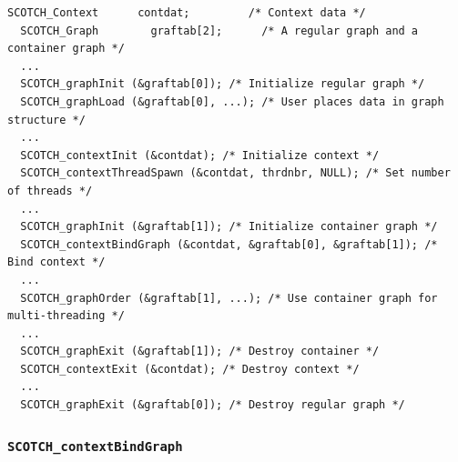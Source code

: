 \begin{lstlisting}[float,style=language-c,label={list-lib-context-spawn},caption={Sample
code for running multi-threaded computations using a dedicated
pool of threads. This code is run by the main thread. All
\libscotch\ routines which are passed the context graph (instead
of the regular graph) will make use of the dedicated pool. If
\libscotch\ routines are called on the regular graph, a local pool
is created and destroyed for every function call.}]
  SCOTCH_Context      contdat;         /* Context data */
  SCOTCH_Graph        graftab[2];      /* A regular graph and a container graph */
  ...
  SCOTCH_graphInit (&graftab[0]); /* Initialize regular graph */
  SCOTCH_graphLoad (&graftab[0], ...); /* User places data in graph structure */
  ...
  SCOTCH_contextInit (&contdat); /* Initialize context */
  SCOTCH_contextThreadSpawn (&contdat, thrdnbr, NULL); /* Set number of threads */
  ...
  SCOTCH_graphInit (&graftab[1]); /* Initialize container graph */
  SCOTCH_contextBindGraph (&contdat, &graftab[0], &graftab[1]); /* Bind context */
  ...
  SCOTCH_graphOrder (&graftab[1], ...); /* Use container graph for multi-threading */
  ...
  SCOTCH_graphExit (&graftab[1]); /* Destroy container */
  SCOTCH_contextExit (&contdat); /* Destroy context */
  ...
  SCOTCH_graphExit (&graftab[0]); /* Destroy regular graph */
\end{lstlisting}

\subsubsection{\texttt{SCOTCH\_contextBindGraph}}


